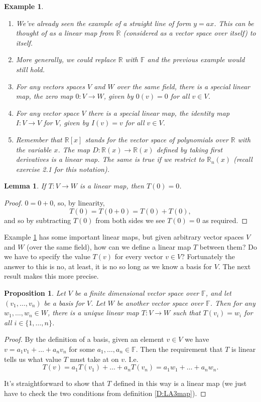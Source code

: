 \documentclass{article}
\theoremstyle{plain}
\newtheorem{proposition}[theorem]{Proposition}{\bfseries}{\itshape}
\newtheorem{lemma}[theorem]{Lemma}{\bfseries}{\upshape}
\newtheorem{example}[theorem]{Example}{\bfseries}{\upshape}
\newcommand{\bR}{\mathbb{R}}
\newcommand{\bF}{\mathbb{F}}
\begin{document}
\begin{example}\label{E:LA3maps}\mbox{}
\begin{enumerate}
\item We've already seen the example of a straight line of form $y = ax$. This can be thought of as a linear map from $\bR$ (considered as a vector space over itself) to itself.
\item More generally, we could replace $\bR$ with $\bF$ and the previous example would still hold.
\item  For any vectors spaces $V$ and $W$ over the same field, there is a special linear map, the zero map $0:V\to W$, given by $0(v) = 0$ for all $v\in V$.
\item For any vector space $V$ there is a special linear map, the identity map $I:V\to V$ for $V$, given by $I(v) = v$ for all $v\in V$. 
\item Remember that $\bR[x]$ stands for the vector space of polynomials over $\bR$ with the variable $x$. The map $D:\bR(x)\to \bR(x)$ defined by taking first derivatives is a linear map. The same is true if we restrict to $\bR_n(x)$ (recall exercise 2.1 for this notation).
\end{enumerate}
\end{example}

\begin{lemma}\label{L:LA3zero}
If $T:V\to W$ is a linear map, then $T(0) = 0$.
\end{lemma}
\begin{proof}
$0 = 0+0$, so, by linearity, 
\[T(0)=T(0+0) = T(0)+ T(0),\]
and so by subtracting $T(0)$ from both sides we see $T(0)=0$ as required.
\end{proof}

Example \ref{E:LA3maps} has some important linear maps, but given arbitrary vector spaces $V$ and $W$ (over the same field), how can we define a linear map $T$ between them? Do we have to specify the value $T(v)$ for every vector $v\in V$? Fortunately the answer to this is no, at least, it is no so long as we know a basis for $V$. The next result makes this more precise.   

\begin{proposition}\label{P:LA3mapdef}
Let $V$ be a finite dimensional vector space over $\bF$, and let $(v_1,\ldots,v_n)$ be a basis for $V$. Let $W$ be another vector space over $\bF$. Then for any $w_1,\ldots,w_n\in W$, there is a unique linear map $T:V\to W$ such that $T(v_i)=w_i$ for all $i\in\{1,\ldots,n\}$.
\end{proposition}
\begin{proof}
By the definition of a basis, given an element $v\in V$ we have $v = a_1v_1+\ldots +a_nv_n$ for some $a_1,\ldots,a_n\in\bF$. Then the requirement that $T$ is linear tells us what value $T$ must take at on $v$. I.e. 
\[T(v) = a_1T(v_1)+\ldots+a_nT(v_n) = a_1w_1+\ldots +a_n w_n. \]

It's straightforward to show that $T$ defined in this way is a linear map (we just have to check the two conditions from definition \ref{D:LA3map}).
\end{proof}
\end{document}
